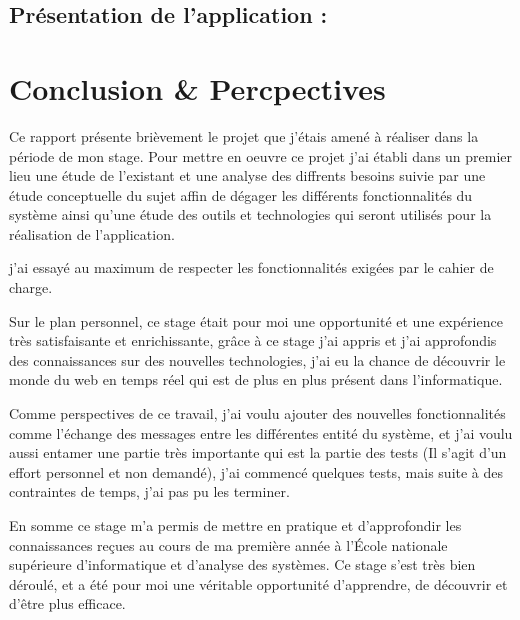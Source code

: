 \documentclass[12pt,a4paper,twoside]{report}
\begin{document}
	\section{Présentation de l'application :}{
	}
	\chapter*{Conclusion \& Percpectives}
	\label{chap:conclusion}{
		Ce rapport présente brièvement le projet que j'étais amené à réaliser dans la période de mon stage. Pour mettre en oeuvre ce projet j'ai établi dans un premier lieu
une étude de l'existant et une analyse des diffrents besoins suivie par une étude conceptuelle du sujet affin de dégager les différents fonctionnalités du système ainsi qu'une étude des outils et technologies qui seront utilisés pour la réalisation de l'application.

j'ai essayé au maximum de respecter les fonctionnalités exigées par le cahier de charge.

Sur le plan personnel, ce stage était pour moi une opportunité et une expérience très satisfaisante et enrichissante, grâce à ce stage j'ai appris et j'ai approfondis des connaissances sur des nouvelles technologies, j'ai eu la chance de découvrir le monde du web en temps réel qui est de plus en plus présent dans l'informatique.

Comme perspectives de ce travail, j'ai voulu ajouter des nouvelles fonctionnalités comme l’échange des messages entre les différentes entité du système, et j'ai voulu aussi entamer une partie très importante qui est la partie des tests (Il s'agit d'un effort personnel et non demandé), j'ai commencé quelques tests, mais suite à des contraintes de temps, j'ai pas pu les terminer.

En somme ce stage m'a permis de mettre en pratique et d'approfondir les connaissances reçues au cours de ma première année à l'École nationale supérieure d'informatique et d'analyse des systèmes. Ce stage s'est très bien déroulé, et a été pour moi une véritable opportunité d'apprendre, de découvrir et d'être plus efficace.
	}
\end{document}

